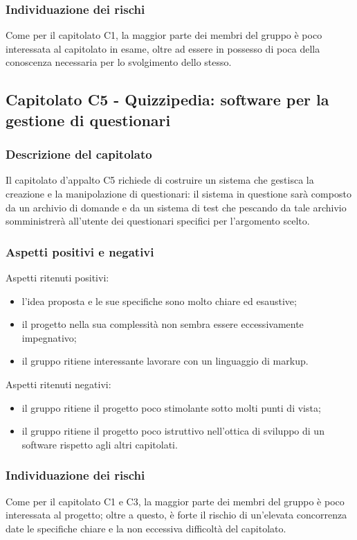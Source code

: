 \documentclass[../nStudioDiFattibilita.tex]{subfiles}
\begin{document}
		\subsubsection{Individuazione dei rischi}
		Come per il capitolato C1, la maggior parte dei membri del gruppo è poco interessata al capitolato in esame, oltre ad essere in possesso di poca della conoscenza necessaria per lo svolgimento dello stesso.
	\subsection{Capitolato C5 - Quizzipedia: software per la gestione di questionari}
		\subsubsection{Descrizione del capitolato}
		Il capitolato d'appalto C5 richiede di costruire un sistema che gestisca la creazione e la manipolazione di questionari: il sistema in questione sarà composto da un archivio di domande e da un sistema di test che pescando da tale archivio somministrerà all'utente dei questionari specifici per l'argomento scelto.
		\subsubsection{Aspetti positivi e negativi}
		Aspetti ritenuti positivi:
			\begin{itemize}
				\item l'idea proposta e le sue specifiche sono molto chiare ed esaustive;
				\item il progetto nella sua complessità non sembra essere eccessivamente impegnativo;
				\item il gruppo ritiene interessante lavorare con un linguaggio di markup.
			\end{itemize}
		Aspetti ritenuti negativi:
			\begin{itemize}
				\item il gruppo ritiene il progetto poco stimolante sotto molti punti di vista;
				\item il gruppo ritiene il progetto poco istruttivo nell'ottica di sviluppo di un software rispetto agli altri capitolati.
			\end{itemize}
		\subsubsection{Individuazione dei rischi}
		Come per il capitolato C1 e C3, la maggior parte dei membri del gruppo è poco interessata al progetto; oltre a questo, è forte il rischio di un'elevata concorrenza date le specifiche chiare e la non eccessiva difficoltà del capitolato.
\end{document}
